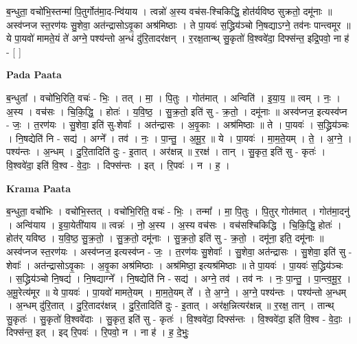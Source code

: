 \documentclass[17pt]{extarticle}
\begin{document}
ब॒न्धुता॒ वचो॑भि॒स्तन्मा॑ पि॒तुर्गोत॑मा॒द-न्वि॑याय । त्वन्नो॑ अ॒स्य वच॑स-श्चिकिद्धि॒ होत॑र्यविष्ठ सुक्रतो॒ दमू॑नाः ॥ अस्व॑प्नज स्त॒रण॑यः सु॒शेवा॒ अत॑न्द्रासोऽवृ॒का अश्र॑मिष्ठाः । ते पा॒यवः॑ स॒द्ध्रिय॑ञ्चो नि॒षद्याऽग्ने॒ तव॑नः पान्त्वमूर ॥ ये पा॒यवो॑ मामते॒यं ते॑ अग्ने॒ पश्य॑न्तो अ॒न्धं दु॑रि॒तादर॑क्षन् । र॒रक्ष॒तान्थ् सु॒कृतो॑ वि॒श्ववे॑दा॒ दिफ्स॑न्त॒ इद्रि॒पवो॒ ना ह॑ - [ ] \newline

\textbf{Pada Paata} \newline

ब॒न्धुता᳚ । वचो॑भि॒रिति॒ वचः॑ - भिः॒ । तत् । मा॒ । पि॒तुः । गोत॑मात् । अन्विति॑ । इ॒या॒य॒ ॥ त्वम् । नः॒ । अ॒स्य । वच॑सः । चि॒कि॒द्धि॒ । होतः॑ । य॒वि॒ष्ठ॒ । सु॒क्र॒तो॒ इति॑ सु - क्र॒तो॒ । दमू॑नाः ॥ अस्व॑प्नज॒ इत्यस्व॑प्न - जः॒ । त॒रण॑यः । सु॒शेवा॒ इति॑ सु-शेवाः᳚ । अत॑न्द्रासः । अ॒वृ॒काः । अश्र॑मिष्ठाः ॥ ते । पा॒यवः॑ । स॒द्ध्रिय॑ञ्चः । नि॒षद्येति॑ नि - सद्य॑ । अग्ने᳚ । तव॑ । नः॒ । पा॒न्तु॒ । अ॒मू॒र॒ ॥ ये । पा॒यवः॑ । मा॒म॒ते॒यम् । ते॒ । अ॒ग्ने॒ । पश्य॑न्तः । अ॒न्धम् । दु॒रि॒तादिति॑ दुः - इ॒तात् । अर॑क्षन्न् ॥ र॒रक्ष॑ । तान् । सु॒कृत॒ इति॑ सु - कृतः॑ । वि॒श्ववे॑दा॒ इति॑ वि॒श्व - वे॒दाः॒ । दिफ्स॑न्तः । इत् । रि॒पवः॑ । न । ह॒ ।  \newline


\textbf{Krama Paata} \newline

ब॒न्धुता॒ वचो॑भिः । वचो॑भि॒स्तत् । वचो॑भि॒रिति॒ वचः॑ - भिः॒ । तन्मा᳚ । मा॒ पि॒तुः । पि॒तुर् गोत॑मात् । गोत॑मा॒दनु॑ । अन्वि॑याय । इ॒या॒येती॑याय ॥ त्वन्नः॑ । नो॒ अ॒स्य । अ॒स्य वच॑सः । वच॑सश्चिकिद्धि । चि॒कि॒द्धि॒ होतः॑ । होत॑र् यविष्ठ । य॒वि॒ष्ठ॒ सु॒क्र॒तो॒ । सु॒क्र॒तो॒ दमू॑नाः । सु॒क्र॒तो॒ इति॑ सु - क्र॒तो॒ । दमू॑ना॒ इति॒ दमू॑नाः ॥ अस्व॑प्नज स्त॒रण॑यः । अस्व॑प्नज॒ इत्यस्व॑प्न - जः॒ । त॒रण॑यः सु॒शेवाः᳚ । सु॒शेवा॒ अत॑न्द्रासः । सु॒शेवा॒ इति॑ सु - शेवाः᳚ । अत॑न्द्रासोऽवृ॒काः । अ॒वृ॒का अश्र॑मिष्ठाः । अश्र॑मिष्ठा॒ इत्यश्र॑मिष्ठाः ॥ ते पा॒यवः॑ । पा॒यवः॑ स॒द्ध्रिय॑ञ्चः । स॒द्ध्रिय॑ञ्चो नि॒षद्य॑ । नि॒षद्याग्ने᳚ । नि॒षद्येति॑ नि - सद्य॑ । अग्ने॒ तव॑ । तव॑ नः । नः॒ पा॒न्तु॒ । पा॒न्त्व॒मू॒र॒ । अ॒मू॒रेत्य॑मूर ॥ ये पा॒यवः॑ । पा॒यवो॑ मामते॒यम् । मा॒म॒ते॒यम् ते᳚ । ते॒ अ॒ग्ने॒ । अ॒ग्ने॒ पश्य॑न्तः । पश्य॑न्तो अ॒न्धम् । अ॒न्धम् दु॑रि॒तात् । दु॒रि॒तादर॑क्षन्न् । दु॒रि॒तादिति॑ दुः - इ॒तात् । अर॑क्ष॒न्नित्यर॑क्षन्न् ॥ र॒रक्ष॒ तान् । तान्थ् सु॒कृतः॑ । सु॒कृतो॑ वि॒श्ववे॑दाः । सु॒कृत॒ इति॑ सु - कृतः॑ । वि॒श्ववे॑दा॒ दिफ्स॑न्तः । वि॒श्ववे॑दा॒ इति॑ वि॒श्व - वे॒दाः॒ । दिफ्स॑न्त॒ इत् । इद् रि॒पवः॑ । रि॒पवो॒ न । ना ह॑ । ह॒ दे॒भुः॒ \newline
\end{document}
